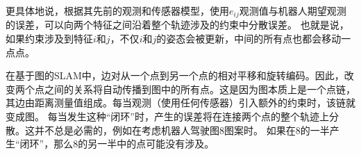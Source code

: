 
更具体地说，根据其先前的观测和传感器模型，使用$ e_{ij} $观测值与机器人期望观测的误差，可以向两个特征之间沿着整个轨迹涉及的约束中分散误差。 也就是说，如果约束涉及到特征$ i $和$ j $，不仅$ i $和$ j $的姿态会被更新，中间的所有点也都会移动一点点。





在基于图的SLAM中，边对从一个点到另一个点的相对平移和旋转编码。因此，改变两个点之间的关系将自动传播到图中的所有点。这是因为图本质上是一个点链，其边由距离测量值组成。每当观测（使用任何传感器）引入额外的约束时，该链就变成图。 每当发生这种“闭环”时，产生的误差将在连接两个点的整个轨迹上分散。这并不总是必需的，例如在考虑机器人驾驶图8图案时。 如果在8的一半产生“闭环”，那么8的另一半中的点可能没有涉及。



